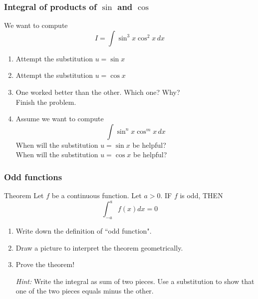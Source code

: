 \documentclass[14pt]{beamer}
\newcommand {\DS} [1] {${\displaystyle #1}$}
\newcommand{\p}{\pause}
\newcommand{\setsize}[1]{\fontsize{#1}{#1}\selectfont} %
\newcommand{\smallerfont}{\setsize{13}} %
\begin{document}
\begin{frame}[t]
\smallerfont
\frametitle{Integral of products of $\sin$ and $\cos$}
We want to compute
\vspace{-.5cm}
	$$
		I = \int \sin^3 x \cos^2 x \, dx
	$$

\begin{enumerate}
	\item  Attempt the substitution \DS{u = \sin x}
	\item  Attempt the substitution \DS{u = \cos x}
	\item  One worked better than the other.  Which one?  Why? \\ 
	  Finish the problem.
\p
	\item  Assume we want to compute
		$$
			\int \sin^{n} x \cos^{m} x \, dx
		$$
		When will the substitution \DS{u = \sin x} be helpful? \\
		When will the substitution \DS{u = \cos x} be helpful?
\end{enumerate}

\end{frame}
\begin{frame}[t]
\smallerfont
\frametitle{Odd functions}

\begin{block}{Theorem}
Let $f$ be a continuous function.  Let $a >0$.  IF $f$ is odd, THEN
	$$
		\int_{-a}^{a} f(x) dx = 0
	$$
\end{block}

\p

\begin{enumerate}
	\item  Write down the definition of ``odd function".
	\item  Draw a picture to interpret the theorem geometrically.
	\item  Prove the theorem!
	
		\emph{Hint:}  Write the integral as sum of two pieces.  Use a substitution to show that one of the two pieces equals minus the other.
\end{enumerate}

\end{frame}
\end{document}
